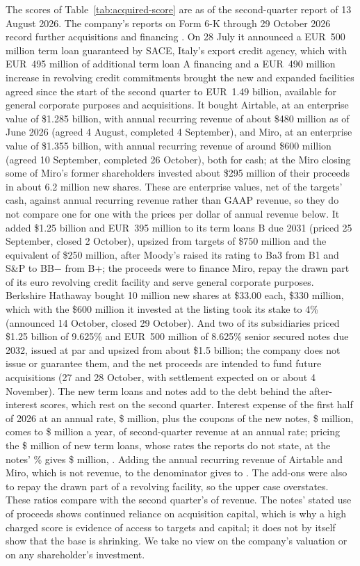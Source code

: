 The scores of Table~\ref{tab:acquired-score} are as of the second-quarter report of 13 August 2026. The company's reports on Form 6-K through 29 October 2026 record further acquisitions and financing \citep{bendingspoons2026sixk}. On 28 July it announced a EUR~500 million term loan guaranteed by SACE, Italy's export credit agency, which with EUR~495 million of additional term loan A financing and a EUR~490 million increase in revolving credit commitments brought the new and expanded facilities agreed since the start of the second quarter to EUR~1.49 billion, available for general corporate purposes and acquisitions. It bought Airtable, at an enterprise value of \$1.285 billion, with annual recurring revenue of about \$480 million as of June 2026 (agreed 4 August, completed 4 September), and Miro, at an enterprise value of \$1.355 billion, with annual recurring revenue of around \$600 million (agreed 10 September, completed 26 October), both for cash; at the Miro closing some of Miro's former shareholders invested about \$295 million of their proceeds in about 6.2 million new shares. These are enterprise values, net of the targets' cash, against annual recurring revenue rather than GAAP revenue, so they do not compare one for one with the prices per dollar of annual revenue below. It added \$1.25 billion and EUR~395 million to its term loans B due 2031 (priced 25 September, closed 2 October), upsized from targets of \$750 million and the equivalent of \$250 million, after Moody's raised its rating to Ba3 from B1 and S\&P to BB$-$ from B+; the proceeds were to finance Miro, repay the drawn part of its euro revolving credit facility and serve general corporate purposes. Berkshire Hathaway bought 10 million new shares at \$33.00 each, \$330 million, which with the \$600 million it invested at the listing took its stake to 4\% (announced 14 October, closed 29 October). And two of its subsidiaries priced \$1.25 billion of 9.625\% and EUR~500 million of 8.625\% senior secured notes due 2032, issued at par and upsized from about \$1.5 billion; the company does not issue or guarantee them, and the net proceeds are intended to fund future acquisitions (27 and 28 October, with settlement expected on or about 4 November). The new term loans and notes add to the debt behind the after-interest scores, which rest on the second quarter. Interest expense of the first half of 2026 at an annual rate, \$\acqRunRateIntHOne{} million, plus the coupons of the new notes, \$\acqNotesCoupon{} million, comes to \$\acqRunRateInt{} million a year, \acqRunRateShQ{} of second-quarter revenue at an annual rate; pricing the \$\acqUnpricedDebt{} million of new term loans, whose rates the reports do not state, at the notes' \acqCouponMarg\% gives \$\acqRunRateIntHi{} million, \acqRunRateShQHi. Adding the annual recurring revenue of Airtable and Miro, which is not revenue, to the denominator gives \acqRunRateShPf{} to \acqRunRateShPfHi. The add-ons were also to repay the drawn part of a revolving facility, so the upper case overstates. These ratios compare with the second quarter's \acqQTwoInt{} of revenue. The notes' stated use of proceeds shows continued reliance on acquisition capital, which is why a high charged score is evidence of access to targets and capital; it does not by itself show that the base is shrinking. We take no view on the company's valuation or on any shareholder's investment.
